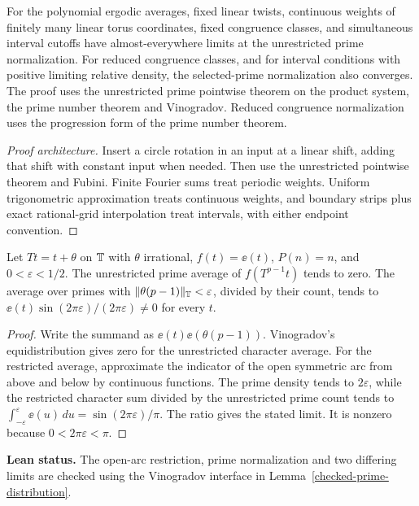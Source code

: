 \begin{lemma}\label{checked-bohr-weights}
\leanok
For the polynomial ergodic averages, fixed linear twists,
continuous weights of finitely many linear torus coordinates,
fixed congruence classes, and simultaneous interval cutoffs have
almost-everywhere limits at the unrestricted prime normalization.
For reduced congruence classes, and for interval conditions with
positive limiting relative density, the selected-prime normalization
also converges. The proof uses the unrestricted prime pointwise theorem
on the product system, the prime number theorem and Vinogradov.
Reduced congruence normalization uses the progression form of the
prime number theorem.
\end{lemma}
\begin{proof}[Proof architecture]
\leanok
Insert a circle rotation in an input at a linear shift, adding that
shift with constant input when needed. Then use the unrestricted
pointwise theorem and Fubini. Finite Fourier sums treat periodic
weights. Uniform trigonometric approximation treats continuous
weights, and boundary strips plus exact rational-grid interpolation
treat intervals, with either endpoint convention.
\end{proof}

\begin{lemma}\label{checked-bohr-eigenfunction}
\leanok
Let $Tt=t+\theta$ on $\mathbb T$ with $\theta$ irrational, $f(t)=\ee(t)$,
$P(n)=n$, and $0<\varepsilon<1/2$. The unrestricted prime average
of $f(T^{p-1}t)$ tends to zero. The average over primes with
$\lVert\theta(p-1)\rVert_{\mathbb T}<\varepsilon$, divided by their count, tends to
$\ee(t)\sin(2\pi\varepsilon)/(2\pi\varepsilon)\ne0$ for every $t$.
\end{lemma}
\begin{proof}
\leanok
Write the summand as $\ee(t)\ee(\theta(p-1))$. Vinogradov's
equidistribution gives zero for the unrestricted character average.
For the restricted average, approximate the indicator of the
open symmetric arc from above and below by continuous functions.
The prime density tends to $2\varepsilon$, while the restricted
character sum divided by the unrestricted prime count tends to
$\int_{-\varepsilon}^{\varepsilon}\ee(u)\,du=\sin(2\pi\varepsilon)/\pi$.
The ratio gives the stated limit. It is nonzero because
$0<2\pi\varepsilon<\pi$.
\end{proof}
\noindent\textbf{Lean status.} The open-arc restriction, prime
normalization and two differing limits are checked using the
Vinogradov interface in Lemma~\ref{checked-prime-distribution}.

